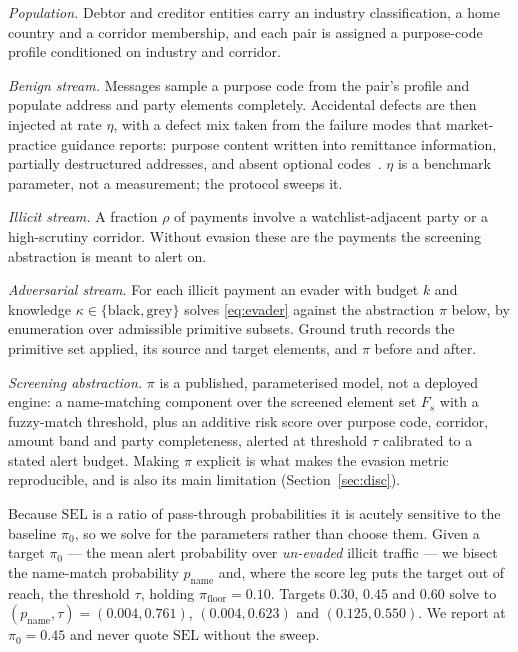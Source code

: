 \documentclass[conference]{IEEEtran}
\begin{document}
\emph{Population.} Debtor and creditor entities carry an industry
classification, a home country and a corridor membership, and each pair is
assigned a purpose-code profile conditioned on industry and corridor.

\emph{Benign stream.} Messages sample a purpose code from the pair's profile
and populate address and party elements completely. Accidental defects are
then injected at rate $\eta$, with a defect mix taken from the failure modes
that market-practice guidance reports: purpose content written into
remittance information, partially destructured addresses, and absent optional
codes~\cite{pmpg2024}. $\eta$ is a benchmark parameter, not a measurement; the
protocol sweeps it.

\emph{Illicit stream.} A fraction $\rho$ of payments involve a
watchlist-adjacent party or a high-scrutiny corridor. Without evasion these
are the payments the screening abstraction is meant to alert on.

\emph{Adversarial stream.} For each illicit payment an evader with budget
$k$ and knowledge $\kappa \in \{\text{black},\text{grey}\}$ solves
\eqref{eq:evader} against the abstraction $\pi$ below, by enumeration over
admissible primitive subsets. Ground truth records the primitive set
applied, its source and target elements, and $\pi$ before and after.

\emph{Screening abstraction.} $\pi$ is a published, parameterised model, not a
deployed engine: a name-matching component over the screened element set
$F_s$ with a fuzzy-match threshold, plus an additive risk score over purpose
code, corridor, amount band and party completeness, alerted at threshold
$\tau$ calibrated to a stated alert budget. Making $\pi$ explicit is what
makes the evasion metric reproducible, and is also its main limitation
(Section~\ref{sec:disc}).

Because $\mathrm{SEL}$ is a ratio of pass-through probabilities it is acutely
sensitive to the baseline $\pi_0$, so we solve for the parameters rather than
choose them. Given a target $\pi_0$ --- the mean alert probability over
\emph{un-evaded} illicit traffic --- we bisect the name-match probability
$p_{\mathrm{name}}$ and, where the score leg puts the target out of reach,
the threshold $\tau$, holding $\pi_{\mathrm{floor}}=0.10$. Targets $0.30$,
$0.45$ and $0.60$ solve to $(p_{\mathrm{name}},\tau) = (0.004,0.761)$,
$(0.004,0.623)$ and $(0.125,0.550)$. We report at $\pi_0=0.45$ and never
quote $\mathrm{SEL}$ without the sweep.
\end{document}
